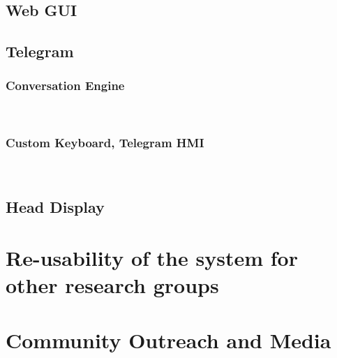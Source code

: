 \documentclass[runningheads,a4paper]{llncs}
\begin{document}
\subsection{Web GUI}

\subsection{Telegram\texttrademark\hspace{0em}}

\subsubsection{Conversation Engine}\


\subsubsection{Custom Keyboard, Telegram HMI}\



\subsection{Head Display}



\section{Re-usability of the system for other research groups}


\section{Community Outreach and Media}







%
\newpage

\end{document}
